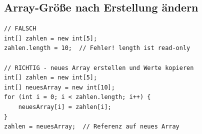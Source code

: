 \subsection*{Array-Größe nach Erstellung ändern}

\begin{lstlisting}
// FALSCH
int[] zahlen = new int[5];
zahlen.length = 10;  // Fehler! length ist read-only

// RICHTIG - neues Array erstellen und Werte kopieren
int[] zahlen = new int[5];
int[] neuesArray = new int[10];
for (int i = 0; i < zahlen.length; i++) {
    neuesArray[i] = zahlen[i];
}
zahlen = neuesArray;  // Referenz auf neues Array
\end{lstlisting}
